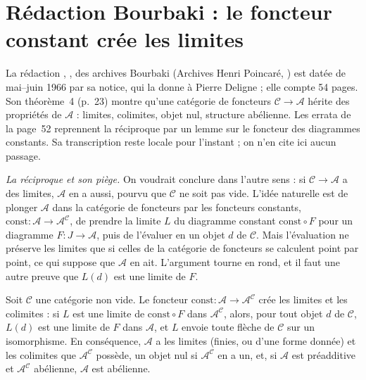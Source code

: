 \section[Rédaction Bourbaki \redac{469} : le foncteur constant crée les limites]{Rédaction Bourbaki  : le foncteur constant crée les limites\protect\piste\protect{}}\label{sec:bourbaki-469}

La rédaction , , des archives Bourbaki (Archives Henri Poincaré, ) est datée de mai--juin 1966 par sa notice, qui la donne à Pierre Deligne ; elle compte 54 pages. Son théorème~4 (p.~23) montre qu'une catégorie de foncteurs $\mathcal C \to \mathcal A$ hérite des propriétés de $\mathcal A$ : limites, colimites, objet nul, structure abélienne. Les errata de la page~52 reprennent la réciproque par un lemme sur le foncteur des diagrammes constants. Sa transcription reste locale pour l'instant ; on n'en cite ici aucun passage.

\emph{La réciproque et son piège.} On voudrait conclure dans l'autre sens : si $\mathcal C \to \mathcal A$ a des limites, $\mathcal A$ en a aussi, pourvu que $\mathcal C$ ne soit pas vide. L'idée naturelle est de plonger $\mathcal A$ dans la catégorie de foncteurs par les foncteurs constants, $\mathrm{const} : \mathcal A \to \mathcal A^{\mathcal C}$, de prendre la limite $L$ du diagramme constant $\mathrm{const} \circ F$ pour un diagramme $F : J \to \mathcal A$, puis de l'évaluer en un objet $d$ de $\mathcal C$. Mais l'évaluation ne préserve les limites que si celles de la catégorie de foncteurs se calculent point par point, ce qui suppose que $\mathcal A$ en ait. L'argument tourne en rond, et il faut une autre preuve que $L(d)$ est une limite de $F$.

\begin{encadre}
\begin{enonce}
Soit $\mathcal C$ une catégorie non vide. Le foncteur $\mathrm{const} : \mathcal A \to \mathcal A^{\mathcal C}$ crée les limites et les colimites : si $L$ est une limite de $\mathrm{const} \circ F$ dans $\mathcal A^{\mathcal C}$, alors, pour tout objet $d$ de $\mathcal C$, $L(d)$ est une limite de $F$ dans $\mathcal A$, et $L$ envoie toute flèche de $\mathcal C$ sur un isomorphisme. En conséquence, $\mathcal A$ a les limites (finies, ou d'une forme donnée) et les colimites que $\mathcal A^{\mathcal C}$ possède, un objet nul si $\mathcal A^{\mathcal C}$ en a un, et, si $\mathcal A$ est préadditive et $\mathcal A^{\mathcal C}$ abélienne, $\mathcal A$ est abélienne.
\end{enonce}
\end{encadre}

